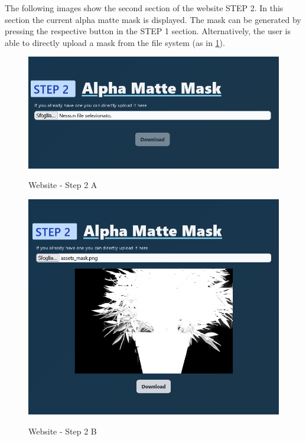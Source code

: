 \documentclass[a4paper]{article}
\begin{document}
The following images show the second section
of the website \textsc{STEP 2}.
In this section the current alpha matte mask
is displayed. The mask can be generated by pressing
the respective button in the \textsc{STEP 1}
section. Alternatively, the user is able to
directly upload a mask from the file system
(as in \ref{fig:fig2b}).

\begin{figure}[h]
    \centering
    \begin{minipage}[b]{0.49\textwidth}
        \includegraphics[width=\textwidth]{website/step2A.png}
        \label{fig:fig2a}
        \caption{Website - Step 2 A}
    \end{minipage}
    \hfill
    \begin{minipage}[b]{0.49\textwidth}
        \includegraphics[width=\textwidth]{website/step2B.png}
        \label{fig:fig2b}
        \caption{Website - Step 2 B}
    \end{minipage}
\end{figure}
\end{document}
